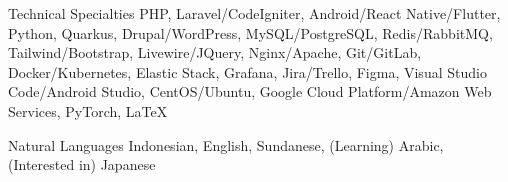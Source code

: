 


\begin{cvskills}


\cvskill
{Technical Specialties} %
{PHP, Laravel/CodeIgniter, Android/React Native/Flutter, Python, Quarkus, Drupal/WordPress, MySQL/PostgreSQL, Redis/RabbitMQ, Tailwind/Bootstrap, Livewire/JQuery, Nginx/Apache, Git/GitLab, Docker/Kubernetes, Elastic Stack, Grafana, Jira/Trello, Figma, Visual Studio Code/Android Studio, CentOS/Ubuntu, Google Cloud Platform/Amazon Web Services, PyTorch, LaTeX} %


\cvskill
{Natural Languages} %
{Indonesian, English, Sundanese, (Learning) Arabic, (Interested in) Japanese} %


\end{cvskills}
